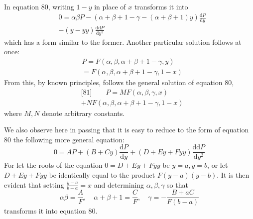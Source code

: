 In equation 80, writing \(1-y\) in place of \(x\) transforms it into
\[
\begin{aligned}&0=\alpha\beta P-(\alpha+\beta+1-\gamma-(\alpha+\beta+1)y)
\frac{\mathrm{d}P}{\mathrm{d}y}\\&-(y-yy)\frac{\mathrm{dd}P}{\mathrm{d}y^2}\end{aligned}
\]
which has a form similar to the former. Another particular solution follows at once:
\[
\begin{aligned}&P=F(\alpha,\beta,\alpha+\beta+1-\gamma,y)\\&=F(\alpha,\beta,\alpha+\beta+1-\gamma,1-x)\end{aligned}
\]
From this, by known principles, follows the general solution of equation 80,
\[
\begin{aligned}&\text{[81]}\qquad
P=MF(\alpha,\beta,\gamma,x)\\&+NF(\alpha,\beta,\alpha+\beta+1-\gamma,1-x)\end{aligned}
\]
where \(M,N\) denote arbitrary constants.

We also observe here in passing that it is easy to reduce to the form of equation 80 the following more general equation:
\[
0=AP+(B+Cy)\frac{\mathrm{d}P}{\mathrm{d}y}
+(D+Ey+Fyy)\frac{\mathrm{dd}P}{\mathrm{d}y^2}
\]
For let the roots of the equation \(0=D+Ey+Fyy\) be \(y=a,y=b\), or let \(D+Ey+Fyy\) be identically equal to the product \(F(y-a)(y-b)\). It is then evident that setting \(\frac{y-a}{b-a}=x\) and determining \(\alpha,\beta,\gamma\) so that
\[
\alpha\beta=\frac{A}{F},\quad
\alpha+\beta+1=\frac{C}{F},\quad
\gamma=-\frac{B+aC}{F(b-a)}
\]
transforms it into equation 80.

